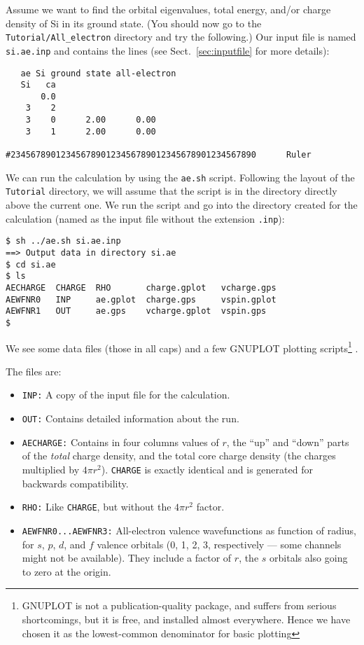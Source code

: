 \documentclass[11pt]{article}
\begin{document}
Assume we want to find the orbital eigenvalues, total energy, and/or
charge density of Si in its ground state. (You should now go to the
{\tt Tutorial/All\_electron} directory and try the following.)  Our
input file is named {\tt si.ae.inp} and contains the lines (see 
Sect.~\ref{sec:inputfile} for more details):

\begin{verbatim}
   ae Si ground state all-electron
   Si   ca
       0.0
    3    2
    3    0      2.00      0.00
    3    1      2.00      0.00

#2345678901234567890123456789012345678901234567890      Ruler
\end{verbatim}

We can run the calculation by using the {\tt ae.sh} script. Following
the layout of the {\tt Tutorial} directory, we will assume that the
script is in the directory directly above the current one. We run the
script and go into the directory created for the calculation (named
as the input file without the extension {\tt .inp}):

\begin{verbatim}
$ sh ../ae.sh si.ae.inp
==> Output data in directory si.ae
$ cd si.ae
$ ls
AECHARGE  CHARGE  RHO       charge.gplot   vcharge.gps
AEWFNR0   INP     ae.gplot  charge.gps     vspin.gplot
AEWFNR1   OUT     ae.gps    vcharge.gplot  vspin.gps
$
\end{verbatim}

We see some data files (those in all caps) and a few GNUPLOT plotting
scripts\footnote{GNUPLOT is not a publication-quality package, and
suffers from serious shortcomings, but it is free, and installed
almost everywhere. Hence we have chosen it as the lowest-common
denominator for basic plotting} . 

The files are:

\begin{itemize}
\item {\tt INP:} A copy of the input file for the calculation.
\item {\tt OUT:} Contains detailed information about the run. 



\item  {\tt AECHARGE:} Contains in four
columns values of $r$, the ``up'' and ``down'' parts of the {\sl
total} charge density, and the total core charge density (the charges
multiplied by $4\pi r^2$). {\tt CHARGE} is exactly identical and is
generated for backwards compatibility.

\item {\tt RHO:} Like {\tt CHARGE}, but without the $4\pi r^2$ factor.
\item {\tt AEWFNR0...AEWFNR3:} All-electron valence wavefunctions as function
of radius, for $s$, $p$, $d$, and $f$ valence orbitals (0, 1, 2, 3,
respectively --- some channels might not be available). They include 
a factor of $r$, the $s$ orbitals also going to zero at the origin.

\end{itemize}
\end{document}
